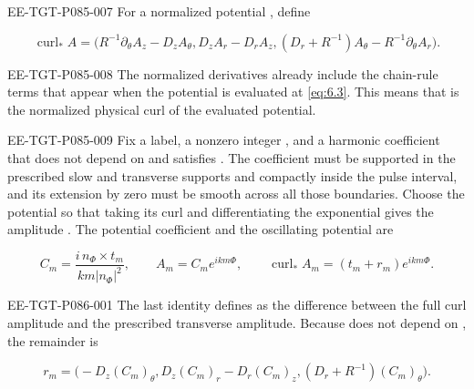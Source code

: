 \begin{EESegment}{EE-TGT-P085-007}
For a normalized potential , define
\end{EESegment}
\begin{equation}
  \operatorname{curl}_* A
  =\bigl(R^{-1}\partial_\theta A_z-D_zA_\theta,
         D_zA_r-D_rA_z,
         (D_r+R^{-1})A_\theta-R^{-1}\partial_\theta A_r\bigr).
\tag{7.37}\label{eq:7.37}
\end{equation}
\begin{EESegment}{EE-TGT-P085-008}
The normalized derivatives already include the chain-rule terms that appear when the potential is
evaluated at \eqref{eq:6.3}. This means that  is the
normalized physical curl of the evaluated potential.
\end{EESegment}

\begin{EESegment}{EE-TGT-P085-009}
Fix a label, a nonzero integer , and a harmonic coefficient
 that does not depend on
 and satisfies . The
coefficient  must be supported in the prescribed slow and transverse
supports and compactly inside the pulse interval, and its extension by zero must be smooth across
all those boundaries. Choose the potential so that taking its curl and differentiating the
exponential gives the amplitude %
. The potential coefficient
 and the oscillating potential
 are
\end{EESegment}
\begin{equation}
  C_m=\frac{i\,n_\Phi\times t_m}{km|n_\Phi|^2},
  \qquad A_m=C_m e^{ikm\Phi},
  \qquad \operatorname{curl}_*A_m=(t_m+r_m)e^{ikm\Phi}.
\tag{7.38}\label{eq:7.38}
\end{equation}
\begin{EESegment}{EE-TGT-P086-001}
The last identity defines  as the difference between the full curl
amplitude and the prescribed transverse amplitude. Because  does not
depend on , the remainder  is
\end{EESegment}
\[
  r_m=\bigl(-D_z(C_m)_\theta,
             D_z(C_m)_r-D_r(C_m)_z,
             (D_r+R^{-1})(C_m)_\theta\bigr).
\]

